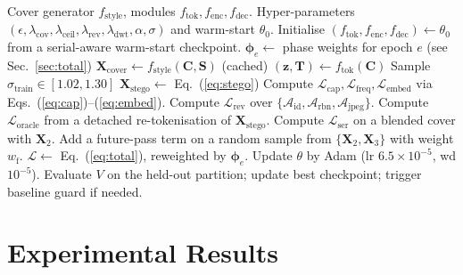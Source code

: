 \documentclass[runningheads]{llncs}
\begin{document}
\begin{algorithm}[t]
\caption{Frequency-guided semantic steganography training.}
\label{alg:train}
\begin{algorithmic}[1]
\Require Cover generator $f_{\text{style}}$, modules $f_{\text{tok}}, f_{\text{enc}}, f_{\text{dec}}$.
\Require Hyper-parameters $(\epsilon, \lambda_{\text{cov}}, \lambda_{\text{ceil}}, \lambda_{\text{rev}}, \lambda_{\text{dwt}}, \alpha,\sigma)$ and warm-start $\theta_{0}$.
\State Initialise $(f_{\text{tok}}, f_{\text{enc}}, f_{\text{dec}})\leftarrow\theta_{0}$ from a serial-aware warm-start checkpoint.
    \State $\boldsymbol{\phi}_{e}\gets$ phase weights for epoch $e$ (see Sec.~\ref{sec:total})
        \State $\mathbf{X}_{\text{cover}}\gets f_{\text{style}}(\mathbf{C},\mathbf{S})$ (cached)
        \State $(\mathbf{z},\mathbf{T})\gets f_{\text{tok}}(\mathbf{C})$
        \State Sample $\sigma_{\text{train}}\!\in\![1.02,1.30]$
        \State $\mathbf{X}_{\text{stego}}\gets$ Eq.~(\ref{eq:stego})
        \State Compute $\mathcal{L}_{\text{cap}}, \mathcal{L}_{\text{freq}}, \mathcal{L}_{\text{embed}}$ via Eqs.~(\ref{eq:cap})--(\ref{eq:embed}).
        \State Compute $\mathcal{L}_{\text{rev}}$ over $\{\mathcal{A}_{\text{id}},\mathcal{A}_{\text{rbn}},\mathcal{A}_{\text{jpeg}}\}$.
        \State Compute $\mathcal{L}_{\text{oracle}}$ from a detached re-tokenisation of $\mathbf{X}_{\text{stego}}$.
        \State Compute $\mathcal{L}_{\text{ser}}$ on a blended cover with $\mathbf{X}_{2}$.
            \State Add a future-pass term on a random sample from $\{\mathbf{X}_{2},\mathbf{X}_{3}\}$ with weight $w_{\text{f}}$.
        \EndIf
        \State $\mathcal{L}\gets$ Eq.~(\ref{eq:total}), reweighted by $\boldsymbol{\phi}_{e}$.
        \State Update $\theta$ by Adam (lr $6.5\!\times\!10^{-5}$, wd $10^{-5}$).
    \EndFor
    \State Evaluate $V$ on the held-out partition; update best checkpoint; trigger baseline guard if needed.
\EndFor
\end{algorithmic}
\end{algorithm}

\section{Experimental Results}
\label{sec:exp}
\end{document}
